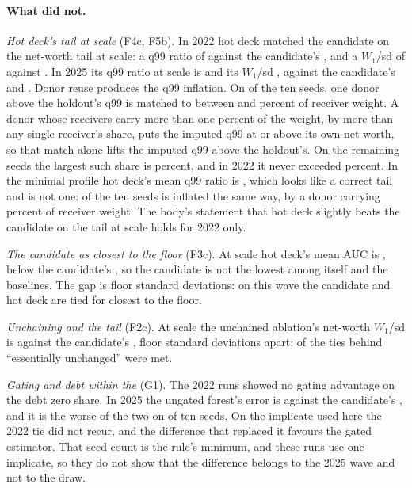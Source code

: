 \paragraph{What did not.} \emph{Hot deck's tail at scale} (F4c, F5b). In 2022
hot deck matched the candidate on the net-worth tail at scale: a q99 ratio of
 against the candidate's
, and a $W_1$/sd of
 against . In
2025 its q99 ratio at scale is  and its $W_1$/sd
, against the candidate's
 and . Donor
reuse produces the q99 inflation. On
 of the ten seeds, one donor above the
holdout's q99 is matched to between  and
 percent of receiver weight. A donor
whose receivers carry more than one percent of the weight, by more than any
single receiver's share, puts the imputed q99 at or above its own net worth,
so that match alone lifts the imputed q99 above the holdout's. On the remaining seeds the largest such share is
 percent, and in 2022 it never exceeded
 percent. In the minimal profile hot deck's
mean q99 ratio is , which looks like a correct
tail and is not one:  of the ten seeds is
inflated the same way, by a donor carrying 
percent of receiver weight. The body's statement that hot deck slightly beats the candidate on
the tail at scale holds for 2022 only.

\emph{The candidate as closest to the floor} (F3c). At scale hot deck's mean AUC
is , below the candidate's
, so the candidate is not the lowest among
itself and the baselines. The gap is  floor
standard deviations: on this wave the candidate and hot deck are tied for
closest to the floor.

\emph{Unchaining and the tail} (F2c). At scale the unchained ablation's
net-worth $W_1$/sd is  against the candidate's
,  floor
standard deviations apart;  of the
 ties behind ``essentially unchanged'' were met.

\emph{Gating and debt within the \scf{}} (G1). The 2022 runs showed no gating
advantage on the debt zero share. In 2025 the ungated forest's error is
 against the candidate's
, and it is the worse of the two on
 of ten seeds. On the implicate used here
the 2022 tie did not recur, and the difference that replaced it favours the
gated estimator. That seed count is the rule's minimum, and these runs use
one implicate, so they do not show that the difference belongs to the 2025
wave and not to the draw.

